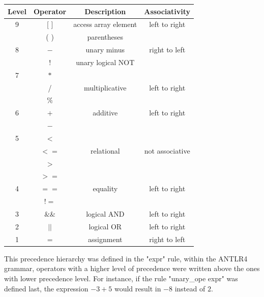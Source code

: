 \documentclass[12pt]{article}
\begin{document}
\begin{table}[htb]
\centering
\begin{tabular}{| c | c | c | c |} 
 \hline
Level & Operator & Description & Associativity        \\ \hline
 9    & [ ]      & access array element & left to right \\ 
      & ( )      & parentheses          &  \\ \hline\hline
          
 8    & $- $     & unary minus          & right to left \\ 
      & $!$      & unary logical NOT    & \\ \hline\hline
      
 7    & $*$      &                      & \\ 
      & /        & multiplicative       & left to right \\
      & $\%$     &                      & \\ \hline\hline
      
 6    & $+$      & additive             & left to right\\
      & $-$      &                      & \\  \hline\hline
 
 5    & $< $     &                      & \\
      & $<=$     & relational           & not associative\\
      & $> $     &                      & \\
      & $>=$     &                      &  \\  \hline\hline 
      
 4    & $==$     & equality             & left to right\\
      & $!=$     &                      & \\ \hline\hline
      
 3    & $\&\&$   & logical AND          & left to right\\   \hline\hline
 
 2    & $||$     & logical OR           & left to right\\   \hline\hline
 
 1    & $=$      & assignment           & right to left \\   \hline
 
\end{tabular}
\end{table}
This precedence hierarchy was defined in the "expr" rule, within the ANTLR4 grammar, operators with a higher level of precedence were written above the ones with lower precedence level. For instance, if the rule "unary\_ope expr" was defined last, the expression $-3 + 5$ would result in $-8$ instead of $2$.
\end{document}
